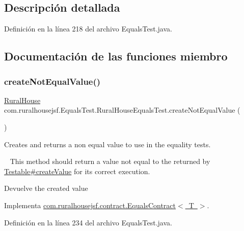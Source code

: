 \subsection{Descripción detallada}


Definición en la línea 218 del archivo Equals\+Test.\+java.



\subsection{Documentación de las funciones miembro}
\mbox{\label{classcom_1_1ruralhousejsf_1_1_equals_test_1_1_rural_house_equals_test_a4021dc1a2dacaed55fa5bacec7ca6165}} 
\subsubsection{\texorpdfstring{createNotEqualValue()}{createNotEqualValue()}}
{\footnotesize\ttfamily \mbox{\hyperlink{classcom_1_1ruralhousejsf_1_1domain_1_1_rural_house}{Rural\+House}} com.\+ruralhousejsf.\+Equals\+Test.\+Rural\+House\+Equals\+Test.\+create\+Not\+Equal\+Value (\begin{DoxyParamCaption}{ }\end{DoxyParamCaption})}



Creates and returns a non equal value to use in the equality tests. 

~\newline
 This method should return a value not equal to the returned by \mbox{\hyperlink{}{Testable\#create\+Value}} for its correct execution.

\begin{DoxyReturn}{Devuelve}
the created value 
\end{DoxyReturn}


Implementa \mbox{\hyperlink{interfacecom_1_1ruralhousejsf_1_1contract_1_1_equals_contract_a65840509b57f6b89e42e2abf1978aa01}{com.\+ruralhousejsf.\+contract.\+Equals\+Contract$<$ T $>$}}.



Definición en la línea 234 del archivo Equals\+Test.\+java.

